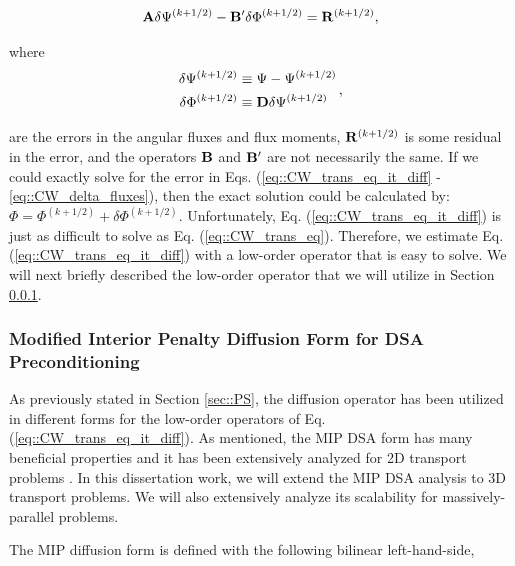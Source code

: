 \documentclass[11pt]{article}
\begin{document}
\begin{equation}
\label{eq::CW_trans_eq_it_diff}
{\bf A} \delta \Psi^{(k+1/2)} - {\bf B}' \delta \Phi^{(k+1/2)} = {\bf R}^{(k+1/2)}, 
\end{equation}

\noindent where
\begin{equation}
\label{eq::CW_delta_fluxes}
\begin{aligned}
\delta \Psi^{(k+1/2)} &\equiv  \Psi - \Psi^{(k+1/2)} \\
\delta \Phi^{(k+1/2)} &\equiv {\bf D} \delta \Psi^{(k+1/2)}
\end{aligned} \, ,
\end{equation}

\noindent are the errors in the angular fluxes and flux moments, ${\bf R}^{(k+1/2)}$ is some residual in the error, and the operators ${\bf B}$ and ${\bf B'}$ are not necessarily the same. If we could exactly solve for the error in Eqs. (\ref{eq::CW_trans_eq_it_diff} - \ref{eq::CW_delta_fluxes}), then the exact solution could be calculated by: $\Phi =  \Phi^{(k+1/2)} + \delta \Phi^{(k+1/2)}$. Unfortunately, Eq. (\ref{eq::CW_trans_eq_it_diff}) is just as difficult to solve as Eq. (\ref{eq::CW_trans_eq}). Therefore, we estimate Eq. (\ref{eq::CW_trans_eq_it_diff}) with a low-order operator that is easy to solve. We will next briefly described the low-order operator that we will utilize in Section \ref{sec::CW_DSA_MIP}.


\subsubsection{Modified Interior Penalty Diffusion Form for DSA Preconditioning}
\label{sec::CW_DSA_MIP}

As previously stated in Section \ref{sec::PS}, the diffusion operator has been utilized in different forms for the low-order operators of Eq. (\ref{eq::CW_trans_eq_it_diff}). As mentioned, the MIP DSA form has many beneficial properties and it has been extensively analyzed for 2D transport problems \cite{ref::DSA_wang_ragusa,turcksin2014discontinuous}. In this dissertation work, we will extend the MIP DSA analysis to 3D transport problems. We will also extensively analyze its scalability for massively-parallel problems.

The MIP diffusion form is defined with the following bilinear left-hand-side,
\end{document}
